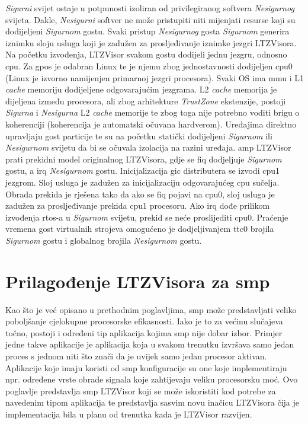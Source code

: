 \documentclass[times, utf8, diplomski, numeric]{fer}
\begin{document}
\textit{Sigurni} svijet ostaje u potpunosti izoliran od privilegiranog softvera \textit{Nesigurnog} svijeta. Dakle,
\textit{Nesigurni} softver ne može pristupiti niti mijenjati resurse koji su dodijeljeni \textit{Sigurnom} gostu. Svaki pristup
\textit{Nesigurnog} gosta \textit{Sigurnom} generira iznimku sloju usluga koji je zadužen za prosljeđivanje iznimke jezgri
LTZVisora.\\
Na početku izvođenja, LTZVisor svakom gostu dodijeli jednu jezgru, odnosno \gls{cpu}. Za \gls{gpos} je odabran Linux te je njemu
zbog jednostavnosti dodijeljen \gls{cpu}0 (Linux je izvorno namijenjen primarnoj jezgri procesora). Svaki OS ima \gls{mmu} i L1
\textit{cache} memoriju dodijeljene odgovarajućim jezgrama. L2 \textit{cache} memorija je dijeljena između procesora, ali zbog
arhitekture \textit{TrustZone} ekstenzije, postoji \textit{Sigurna} i \textit{Nesigurna} L2 \textit{cache} memorije te zbog
toga nije potrebno voditi brigu o koherenciji (koherencija je automatski očuvana hardverom). Uređajima direktno upravljaju gost
particije te su na početku statički dodijeljeni \textit{Sigurnom} ili \textit{Nesigurnom} svijetu da bi se očuvala izolacija
na razini uređaja. \gls{amp} LTZVisor prati prekidni model originalnog LTZVisora, gdje se \gls{fiq} dodjeljuje \textit{Sigurnom} gostu,
a \gls{irq} \textit{Nesigurnom} gostu. Inicijalizacija \gls{gic} distributera se izvodi \gls{cpu}1 jezgrom. Sloj usluga je zadužen za
inicijalizaciju odgovarajućeg \gls{cpu} sučelja. Obrada prekida je rješena tako da ako se \gls{fiq} pojavi na \gls{cpu}0, sloj usluga je zadužen
za prosljeđivanje prekida \gls{cpu}1 procesoru. Ako \gls{irq} dođe prilikom izvođenja \gls{rtos}-a u \textit{Sigurnom} svijetu, prekid se neće proslijediti
\gls{cpu}0. Praćenje vremena gost virtualnih strojeva omogućeno je dodjeljivanjem \gls{ttc}0 brojila \textit{Sigurnom} gostu i globalnog
brojila \textit{Nesigurnom} gostu.

\section{Prilagođenje LTZVisora za \gls{smp}}
Kao što je već opisano u prethodnim poglavljima, \gls{smp} može predstavljati veliko poboljšanje cjelokupne procesorske efikasnosti.
Iako je to za većinu slučajeva točno, postoji i određeni tip aplikacija kojima \gls{smp} nije dobar izbor. Primjer jedne takve
aplikacije je aplikacija koja u svakom trenutku izvršava samo jedan proces s jednom niti što znači da je uvijek samo jedan procesor aktivan.
Aplikacije koje imaju koristi od \gls{smp} konfiguracije su one koje implementiraju npr. određene vrste obrade signala koje
zahtijevaju veliku procesorsku moć. Ovo poglavlje predstavlja \gls{smp} LTZVisor koji se može iskoristiti kod potrebe za navedenim
tipom aplikacija te predstavlja sasvim novu inačicu LTZVisora čija je implementacija bila u planu od trenutka kada je LTZVisor
razvijen.
\end{document}
